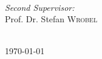 \begin{titlepage}
\begin{minipage}{0.3\textwidth}
\begin{flushleft} \large
\end{flushleft}
\end{minipage}
~
\begin{minipage}{0.6\textwidth}
\begin{flushright} \large
\emph{Second Supervisor:} \\
Prof. Dr. Stefan \textsc{Wrobel} %
\end{flushright}
\end{minipage}\\[9cm]



{\large \today}\\[3cm] %




\vfill %

\end{titlepage}
